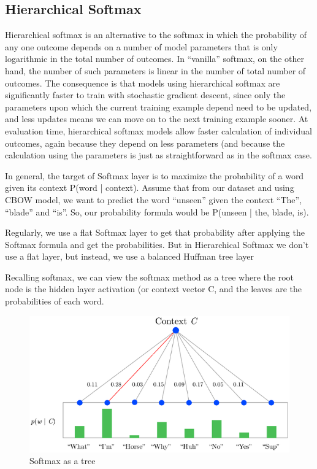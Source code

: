 \subsection{Hierarchical Softmax}

Hierarchical softmax is an alternative to the softmax in which the probability of any one outcome depends on a number of model parameters that is only logarithmic in the total number of outcomes. In “vanilla” softmax, on the other hand, the number of such parameters is linear in the number of total number of outcomes.
The consequence is that models using hierarchical softmax are significantly faster to train with stochastic gradient descent, since only the parameters upon which the current training example depend need to be updated, and less updates means we can move on to the next training example sooner. At evaluation time, hierarchical softmax models allow faster calculation of individual outcomes, again because they depend on less parameters (and because the calculation using the parameters is just as straightforward as in the softmax case.

\vspace{1 cm}

In general, the target of Softmax layer is to maximize the probability of a word given its context P(word | context). Assume that from our dataset and using CBOW model, we want to predict the word “unseen” given the context “The”, “blade” and “is”. So, our probability formula would be P(unseen | the, blade, is).

Regularly, we use a flat Softmax layer to get that probability after applying the Softmax formula and get the probabilities. But in Hierarchical Softmax we don’t use a flat layer, but instead, we use a balanced Huffman tree layer \\

\vspace{1 cm}

Recalling softmax, we can view the softmax method as a tree where the root node is the hidden layer activation (or context vector C, and the leaves are the probabilities of each word.

\begin{figure}[ht]
    \centering
    \includegraphics[scale=0.7]{Images/hsmx.png}
    \caption{Softmax as a tree}
    \label{fig:smxtree}
\end{figure}

